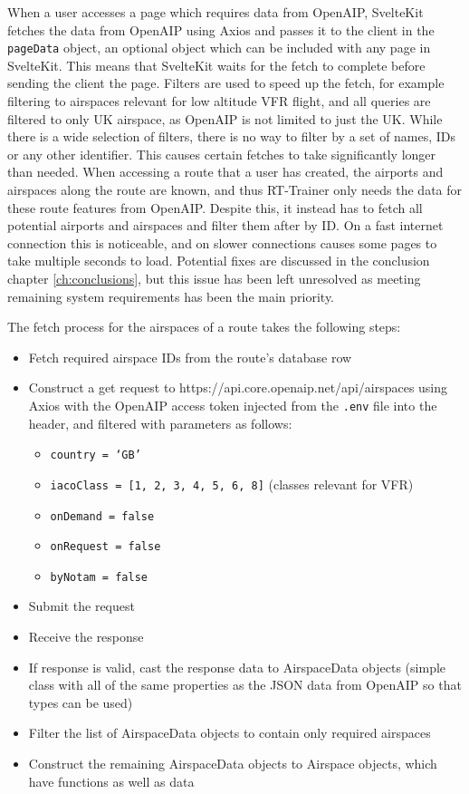 When a user accesses a page which requires data from OpenAIP, SvelteKit fetches the data from OpenAIP using Axios and passes it to the client in the \texttt{pageData} object, an optional object which can be included with any page in SvelteKit. This means that SvelteKit waits for the fetch to complete before sending the client the page. Filters are used to speed up the fetch, for example filtering to airspaces relevant for low altitude VFR flight, and all queries are filtered to only UK airspace, as OpenAIP is not limited to just the UK. While there is a wide selection of filters, there is no way to filter by a set of names, IDs or any other identifier. This causes certain fetches to take significantly longer than needed. When accessing a route that a user has created, the airports and airspaces along the route are known, and thus RT-Trainer only needs the data for these route features from OpenAIP. Despite this, it instead has to fetch all potential airports and airspaces and filter them after by ID. On a fast internet connection this is noticeable, and on slower connections causes some pages to take multiple seconds to load. Potential fixes are discussed in the conclusion chapter \ref{ch:conclusions}, but this issue has been left unresolved as meeting remaining system requirements has been the main priority.

The fetch process for the airspaces of a route takes the following steps:

\begin{itemize}
    \item Fetch required airspace IDs from the route's database row
    \item Construct a get request to https://api.core.openaip.net/api/airspaces using Axios with the OpenAIP access token injected from the \texttt{.env} file into the header, and filtered with parameters as follows:
    \begin{itemize}
        \item \texttt{country = `GB'}
        \item \texttt{iacoClass = [1, 2, 3, 4, 5, 6, 8]} (classes relevant for VFR)
        \item \texttt{onDemand = false}
        \item \texttt{onRequest = false}
        \item \texttt{byNotam = false}
    \end{itemize}
    \item Submit the request
    \item Receive the response
    \item If response is valid, cast the response data to AirspaceData objects (simple class with all of the same properties as the JSON data from OpenAIP so that types can be used)
    \item Filter the list of AirspaceData objects to contain only required airspaces
    \item Construct the remaining AirspaceData objects to Airspace objects, which have functions as well as data
\end{itemize}

